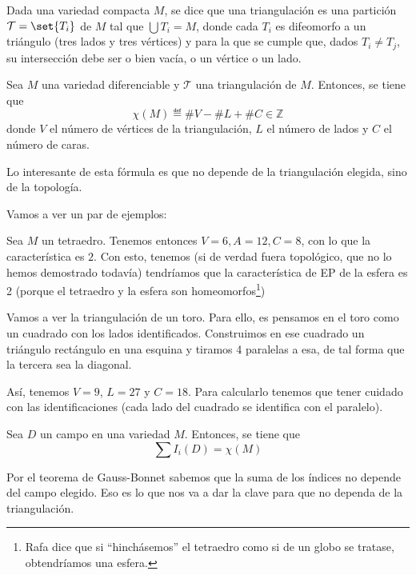 \begin{defn}[Triangulación] Dada una variedad compacta $M$, se dice que una triangulación es una partición $\mathcal{T} = \set{T_i}$ de $M$ tal que $\bigcup T_i = M$, donde cada $T_i$ es difeomorfo a un triángulo (tres lados y tres vértices) y para la que se cumple que, dados $T_i ≠ T_j$, su intersección debe ser o bien vacía, o un vértice o un lado.
\end{defn}

\begin{defn}
Sea $M$ una variedad diferenciable y $\mathcal{T}$ una triangulación de $M$. Entonces, se tiene que \[ \chi(M) ≝ \#V - \#L + \#C ∈ℤ \] donde $V$ el número de vértices de la triangulación, $L$ el número de lados y $C$ el número de caras.
\end{defn}

Lo interesante de esta fórmula es que no depende de la triangulación elegida, sino de la topología.

Vamos a ver un par de ejemplos:

\begin{example}
Sea $M$ un tetraedro. Tenemos entonces $V=6,A=12,C=8$, con lo que la característica es $2$. Con esto, tenemos (si de verdad fuera topológico, que no lo hemos demostrado todavía) tendríamos que la característica de EP de la esfera es 2 (porque el tetraedro y la esfera son homeomorfos\footnote{Rafa dice que si ``hinchásemos'' el tetraedro como si de un globo se tratase, obtendríamos una esfera.})
\end{example}

\begin{example}

Vamos a ver la triangulación de un toro. Para ello, es pensamos en el toro como un cuadrado con los lados identificados. Construimos en ese cuadrado un triángulo rectángulo en una esquina y tiramos 4 paralelas a esa, de tal forma que la tercera sea la diagonal.

Así, tenemos $V=9$, $L=27$ y $C=18$. Para calcularlo tenemos que tener cuidado con las identificaciones (cada lado del cuadrado se identifica con el paralelo).
\end{example}


\begin{theorem}
Sea $D$ un campo en una variedad $M$. Entonces, se tiene que \[ \sum I_i(D) = χ(M) \]
\end{theorem}

Por el teorema de Gauss-Bonnet sabemos que la suma de los índices no depende del campo elegido. Eso es lo que nos va a dar la clave para que no dependa de la triangulación.

